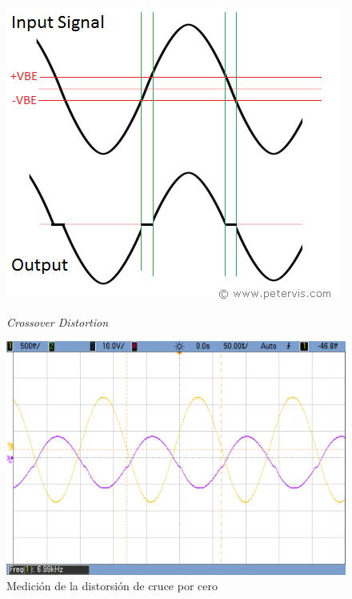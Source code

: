 \begin{figure}[H]
\begin{centering}
\includegraphics[scale=0.5]{../Ex1/iA/Resources1a/crossover}
\par\end{centering}
\caption{\emph{Crossover Distortion}}
\emph{\label{1_a_7}}
\end{figure}

\begin{figure}[H]
\begin{centering}
\includegraphics[scale=0.3]{../Ex1/iA/Resources1a/CrossDistmed}
\par\end{centering}
\caption{Medición de la distorsión de cruce por cero}

\end{figure}

